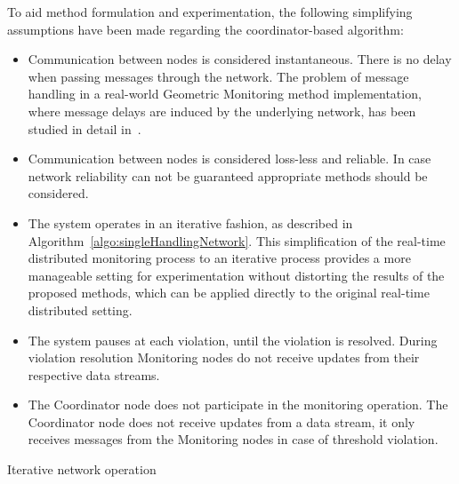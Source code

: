 To aid method formulation and experimentation, the following simplifying assumptions have been made regarding the coordinator-based algorithm:
\begin{itemize}
\item Communication between nodes is considered instantaneous. There is no delay when passing messages through the network. The problem of message handling in a real-world Geometric Monitoring method implementation, where message delays are induced by the underlying network, has been studied in detail in~\cite{Babis2013SimulatorStreams}.

\item Communication between nodes is considered loss-less and reliable. In case network reliability can not be guaranteed appropriate methods should be considered.

\item The system operates in an iterative fashion, as described in Algorithm~\ref{algo:singleHandlingNetwork}. This simplification of the real-time distributed monitoring process to an iterative process provides a more manageable setting for experimentation without distorting the results of the proposed methods, which can be applied directly to the original real-time distributed setting.

\item The system pauses at each violation, until the violation is resolved. During violation resolution Monitoring nodes do not receive updates from their respective data streams.

\item The Coordinator node does not participate in the monitoring operation. The Coordinator node does not receive updates from a data stream, it only receives messages from the Monitoring nodes in case of threshold violation.

\end{itemize}

\begin{algorithm}[H]


\SetAlgoLined
{}
 \caption{Iterative network operation \label{algo:singleHandlingNetwork}} 
\end{algorithm}

